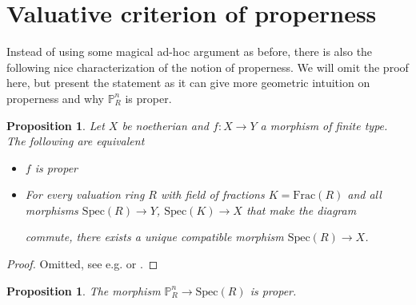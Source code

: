 \documentclass{scrartcl}
\renewcommand{\P}{\mathbb{P}}
\newcommand{\Spec}{\mathrm{Spec}}
\newcommand{\Frac}{\mathrm{Frac}}
\newcommand{\citestacks}[1]{\cite[\href{https://stacks.math.columbia.edu/tag/#1}{Tag #1}]{stacks}}
\newtheorem{prop}[subsection]{Proposition}
\theoremstyle{definition}
\begin{document}
\section{Valuative criterion of properness}
\label{sec:valuative_criterion_properness}
Instead of using some magical ad-hoc argument as before, there is also the following nice characterization of the notion of properness.
We will omit the proof here, but present the statement as it can give more geometric intuition on properness and why $\P_R^n$ is proper.
\begin{prop}
    \label{prop:valuative_criterion_properness}
    Let $X$ be noetherian and $f: X \to Y$ a morphism of finite type.
    The following are equivalent
    \begin{itemize}
        \item $f$ is proper
        \item For every valuation ring $R$ with field of fractions $K = \Frac(R)$ and all morphisms $\Spec(R) \to Y$, $\Spec(K) \to X$ that make the diagram
        \begin{center}
        \end{center}
        commute, there exists a unique compatible morphism $\Spec(R) \to X$.
    \end{itemize}
\end{prop}
\begin{proof}
    Omitted, see e.g. \cite[II.4.7]{hartshorne} or \citestacks{01NH}.
\end{proof}
\begin{prop}
    \label{prop:projective_space_proper_alternative_proof}
    The morphism $\P_R^n \to \Spec(R)$ is proper.
\end{prop}
\end{document}
